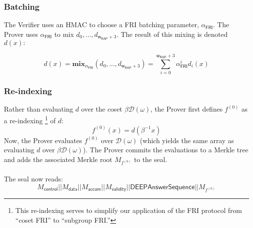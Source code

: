 \documentclass[10pt,letterpaper,titlepage]{article}
\newcommand{\w}[0]{\omega}
\newcommand{\D}[0]{\mathcal{D}}
\theoremstyle{definition}
\begin{document}
\begin{appendices}
\subsubsection*{Batching}
The Verifier uses an HMAC to choose a FRI batching parameter, $\alpha_\mathsf{FRI}$.
The Prover uses $\alpha_\mathsf{FRI}$ to mix $d_0,\ldots,d_{\mathsf{w}_\mathsf{RAP}+3}$. The result of this mixing is denoted $d(x):$

\[d(x) = \textbf{mix}_{\alpha_\mathsf{FRI}}(d_0,\ldots,d_{\mathsf{w}_\mathsf{RAP}+3}) = \sum_{i=0}^{\mathsf{w}_\mathsf{RAP}+3}\alpha_\mathsf{FRI}^i d_i(x)\]
\subsubsection*{Re-indexing}
Rather than evaluating $d$ over the coset $\beta{\D(\w)}$, the Prover first defines $f^{(0)}$ as a re-indexing%
\footnote{This re-indexing serves to simplify our application of the FRI protocol from ``coset FRI'' to ``subgroup FRI.''} of $d$:
\[f^{(0)}(x)=d(\beta^{-1}x)\]
Now, the Prover evaluates $f^{(0)}$ over $\D(\w)$ (which yields the same array as evaluating $d$ over $\beta{\D(\w)}$).
The Prover commits the evaluations to a Merkle tree and adds the associated Merkle root $M_{f^{(0)}}$ to the seal. \\
\\
The seal now reads:
\[M_\mathsf{control}||M_\mathsf{data}||M_\mathsf{accum}||M_\mathsf{validity}||\mathsf{DEEPAnswerSequence}||M_{f^{(0)}}\]


\end{appendices}
\end{document}
